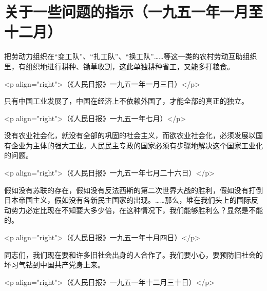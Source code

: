 \section[关于一些问题的指示（一九五一年一月至十二月）]{关于一些问题的指示（一九五一年一月至十二月）}


把劳动力组织在“变工队”、“扎工队”、“换工队”……等这一类的农村劳动互助组织里，有组织地进行耕种、锄草收割，这此单独耕种省工，又能多打粮食。

<p align="right">（《人民日报》一九五一年一月三日）</p>

只有中国工业发展了，中国在经济上不依赖外国了，才能全部的真正的独立。

<p align="right">（《人民日报》一九五一年七月）</p>

没有农业社会化，就没有全部的巩固的社会主义，而欲农业社会化，必须发展以国有企业为主体的强大工业。人民民主专政的国家必须有步骤地解决这个国家工业化的问题。

<p align="right">（《人民日报》一九五一年七月二十六日）</p>

假如没有苏联的存在，假如没有反法西斯的第二次世界大战的胜利，假如没有打倒日本帝国主义，假如没有各新民主国家的出现。……那么，堆在我们头上的国际反动势力必定比现在不知要大多少倍，在这种情况下，我们能够胜利么？显然是不能的。

<p align="right">（《人民日报》一九五一年十月四日）</p>

同志们，我们现在要和许多旧社会出身的人合作了。我们要小心，要预防旧社会的坏习气钻到中国共产党身上来。

<p align="right">（《人民日报》一九五一年十二月三十日）</p>


